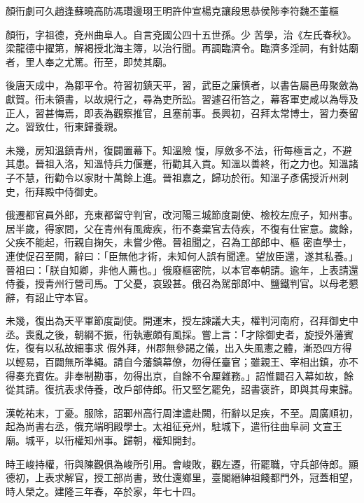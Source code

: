 
\begin{pinyinscope}

 顏衎劇可久趙逢蘇曉高防馮瓚邊珝王明許仲宣楊克讓段思恭侯陟李符魏丕董樞



 顏衎，字祖德，兗州曲阜人。自言兗國公四十五世孫。少
 苦學，治《左氏春秋》。梁龍德中擢第，解褐授北海主簿，以治行聞。再調臨濟令。臨濟多淫祠，有針姑廟者，里人奉之尤篤。衎至，即焚其廟。



 後唐天成中，為鄒平令。符習初鎮天平，習，武臣之廉慎者，以書告屬邑毋聚斂為獻賀。衎未領書，以故規行之，尋為吏所訟。習遽召衎笞之，幕客軍吏咸以為辱及正人，習甚悔焉，即表為觀察推官，且塞前事。長興初，召拜太常博士，習力奏留之。習致仕，衎東歸養親。



 未幾，房知溫鎮青州，復闢置幕下。知溫險
 愎，厚斂多不法，衎每極言之，不避其患。晉祖入洛，知溫恃兵力偃蹇，衎勸其入貢。知溫以善終，衎之力也。知溫諸子不慧，衎勸令以家財十萬餘上進。晉祖嘉之，歸功於衎。知溫子彥儒授沂州刺史，衎拜殿中侍御史。



 俄遷都官員外郎，充東都留守判官，改河陽三城節度副使、檢校左庶子，知州事。居半歲，得家問，父在青州有風痺疾，衎不奏棄官去侍疾，不復有仕宦意。歲餘，父疾不能起，衎親自掬矢，未嘗少倦。晉祖聞之，召為工部郎中、樞
 密直學士，連使促召至闕，辭曰：「臣無他才術，未知何人誤有聞達。望放臣還，遂其私養。」晉祖曰：「朕自知卿，非他人薦也。」俄廢樞密院，以本官奉朝請。逾年，上表請還侍養，授青州行營司馬。丁父憂，哀毀甚。俄召為駕部郎中、鹽鐵判官。以母老懇辭，有詔止守本官。



 未幾，復出為天平軍節度副使。開運末，授左諫議大夫，權判河南府，召拜御史中丞。喪亂之後，朝綱不振，衎執憲頗有風採。嘗上言：「才除御史者，旋授外藩賓佐，復有以私故細事求
 假外拜，州郡無參謁之儀，出入失風憲之體，漸恐四方得以輕易，百闢無所準繩。請自今藩鎮幕僚，勿得任臺官；雖親王、宰相出鎮，亦不得奏充賓佐。非奉制勘事，勿得出京，自餘不令厘雜務。」詔惟闢召入幕如故，餘從其請。復抗表求侍養，改戶部侍郎。衎又堅乞罷免，詔書褒許，即與其母東歸。



 漢乾祐末，丁憂。服除，詔鄆州高行周津遣赴闕，衎辭以足疾，不至。周廣順初，起為尚書右丞，俄充端明殿學士。太祖征兗州，駐城下，遣衎往曲阜祠
 文宣王廟。城平，以衎權知州事。歸朝，權知開封。



 時王峻持權，衎與陳觀俱為峻所引用。會峻敗，觀左遷，衎罷職，守兵部侍郎。顯德初，上表求解官，授工部尚書，致仕還鄉里，臺閣縉紳祖餞都門外，冠蓋相望，時人榮之。建隆三年春，卒於家，年七十四。




\end{pinyinscope}
